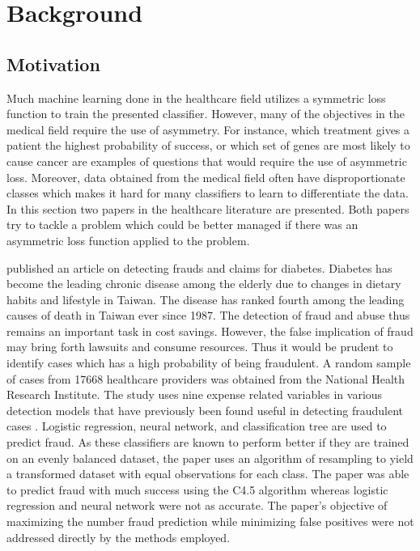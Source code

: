 \section{Background}\label{background}
\subsection{Motivation}\label{motivation}

Much machine learning done in the healthcare field utilizes a symmetric loss function to train the presented classifier. However, many of the objectives in the medical field require the use of asymmetry. For instance, which treatment gives a patient the highest probability of success, or which set of genes are most likely to cause cancer are examples of questions that would require the use of asymmetric loss. Moreover, data obtained from the medical field often have disproportionate classes which makes it hard for many classifiers to learn to differentiate the data. In this section two papers in the healthcare literature are presented. Both papers try to tackle a problem which could be better managed if there was an asymmetric loss function applied to the problem.

\citet{Liou08} published an article on detecting frauds and claims for diabetes. Diabetes has become the leading chronic disease among the elderly due to changes in dietary habits and lifestyle in Taiwan. The disease has ranked fourth among the leading causes of death in Taiwan ever since 1987. The detection of fraud and abuse thus remains an important task in cost savings. However, the false implication of fraud may bring forth lawsuits and consume resources. Thus it would be prudent to identify cases which has a high probability of being fraudulent. A random sample of cases from 17668 healthcare providers was obtained from the National Health Research Institute. The study uses nine expense related variables in various detection models that have previously been found useful in detecting fraudulent cases \citep{Yang06}. Logistic regression, neural network, and classification tree are used to predict fraud. As these classifiers are known to perform better if they are trained on an evenly balanced dataset, the paper uses an algorithm of resampling to yield a transformed dataset with equal observations for each class. The paper was able to predict fraud with much success using the C4.5 algorithm whereas logistic regression and neural network were not as accurate. The paper's objective of maximizing the number fraud prediction while minimizing false positives were not addressed directly by the methods employed. 

